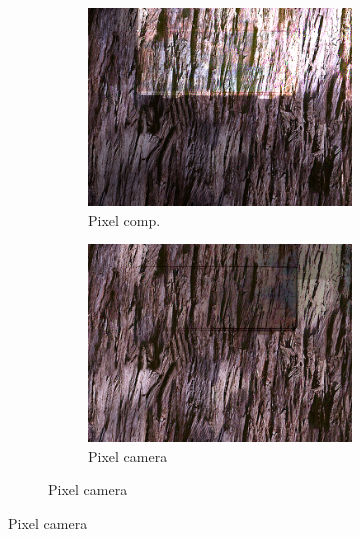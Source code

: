 \begin{figure}[]
\begin{subfigure}{\textwidth}
\begin{subfigure}{0.24\textwidth}
            \includegraphics[width=\textwidth]{images/04-experiment02/carpet/wood/pixel_im.jpg}
            \caption*{Pixel comp.}
        \end{subfigure}
        \hfill
        \begin{subfigure}{0.24\textwidth}
            \centering
            \includegraphics[width=\textwidth]{images/04-experiment02/carpet/wood/pixel_proj.jpg}
            \caption*{Pixel camera}
        \end{subfigure}


\end{subfigure}
\end{figure}
